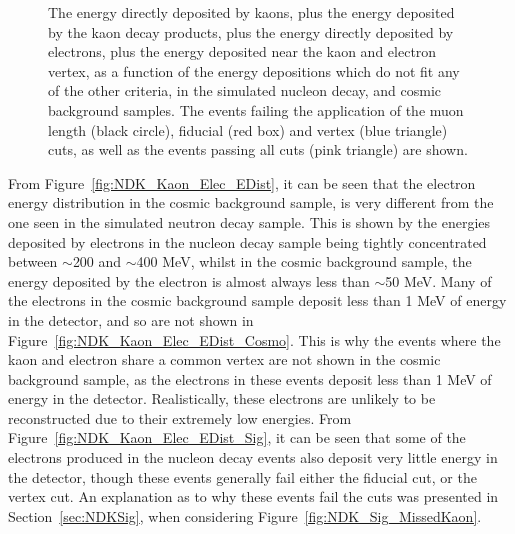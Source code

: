 \begin{figure}
          {The energy directly deposited by kaons, plus the energy deposited by the kaon decay products, plus the energy directly deposited by electrons, plus the energy deposited near the kaon and electron vertex, as a function of the energy depositions which do not fit any of the other criteria, in the simulated nucleon decay, and cosmic background samples. The events failing the application of the muon length (black circle), fiducial (red box) and vertex (blue triangle) cuts, as well as the events passing all cuts (pink triangle) are shown.}
  \label{fig:NDK_AllEDep_Other_EDist}
\end{figure}

From Figure~\ref{fig:NDK_Kaon_Elec_EDist}, it can be seen that the electron energy distribution in the cosmic background sample, is very different from the one seen in the simulated neutron decay sample. This is shown by the energies deposited by electrons in the nucleon decay sample being tightly concentrated between $\sim$200 and $\sim$400 MeV, whilst in the cosmic background sample, the energy deposited by the electron is almost always less than $\sim$50 MeV. Many of the electrons in the cosmic background sample deposit less than 1 MeV of energy in the detector, and so are not shown in Figure~\ref{fig:NDK_Kaon_Elec_EDist_Cosmo}. This is why the events where the kaon and electron share a common vertex are not shown in the cosmic background sample, as the electrons in these events deposit less than 1 MeV of energy in the detector. Realistically, these electrons are unlikely to be reconstructed due to their extremely low energies. From Figure~\ref{fig:NDK_Kaon_Elec_EDist_Sig}, it can be seen that some of the electrons produced in the nucleon decay events also deposit very little energy in the detector, though these events generally fail either the fiducial cut, or the vertex cut. An explanation as to why these events fail the cuts was presented in Section~\ref{sec:NDKSig}, when considering Figure~\ref{fig:NDK_Sig_MissedKaon}. \\

